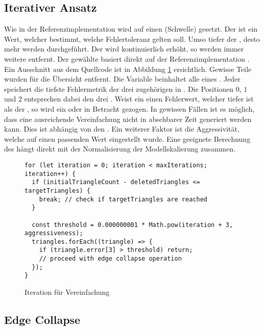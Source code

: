 \subsection{Iterativer Ansatz}

Wie in der Referenzimplementation wird auf einen  (Schwelle) gesetzt. Der  ist ein Wert, welcher bestimmt, welche Fehlertoleranz gelten soll. Umso tiefer der , desto mehr  werden durchgeführt. Der  wird kontinuierlich erhöht, so werden immer weitere  entfernt. Der gewählte  basiert direkt auf der Referenzimplementation \cite{fastQuadricMeshSimplification}. Ein Ausschnitt aus dem Quellcode ist in Abbildung \ref{code:thresholdIteration} ersichtlich. Gewisse Teile wurden für die Übersicht entfernt. Die Variable  beinhaltet alle  eines . Jeder  speichert die tiefste Fehlermetrik der drei zugehörigen  in . Die Positionen $0$, $1$ und $2$ entsprechen dabei den drei . Weist ein  einen Fehlerwert, welcher tiefer ist als der , so wird ein  oder  in Betracht gezogen. In gewissen Fällen ist es möglich, dass eine ausreichende Vereinfachung nicht in absehbarer Zeit generiert werden kann. Dies ist abhängig von den . Ein weiterer Faktor ist die Aggressivität, welche auf einen passenden Wert eingestellt wurde. Eine geeignete Berechnung des  hängt direkt mit der Normalisierung der Modellskalierung zusammen.

\begin{figure}[H]
  \begin{lstlisting}[style=JavaScript]
for (let iteration = 0; iteration < maxIterations; iteration++) {
  if (initialTriangleCount - deletedTriangles <= targetTriangles) {
    break; // check if targetTriangles are reached
  }

  const threshold = 0.000000001 * Math.pow(iteration + 3, aggressiveness);
  triangles.forEach((triangle) => {
    if (triangle.error[3] > threshold) return;
    // proceed with edge collapse operation
  });
}
  \end{lstlisting}
  \caption{Iteration für Vereinfachung}
  \label{code:thresholdIteration}
\end{figure}


\subsection{Edge Collapse}


